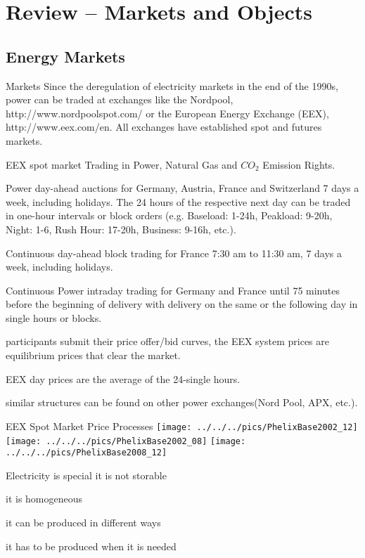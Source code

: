 \section{Review -- Markets and Objects}
\subsection{Energy Markets}

Markets
	Since the deregulation of electricity markets in the end of the 1990s,
	power can be traded at exchanges like the Nordpool, http://www.nordpoolspot.com/
	or the European Energy Exchange (EEX), http://www.eex.com/en. All
	exchanges have established spot and futures markets.


EEX spot market 
	Trading in Power, Natural Gas and $CO_{2}$ Emission Rights. 
	
	Power day-ahead auctions for Germany, Austria, France and Switzerland 7 days a week, including holidays. 
	The 24 hours of the respective next day can be traded in one-hour intervals or block orders (e.g. Baseload: 1-24h, Peakload: 9-20h, Night: 1-6, Rush Hour: 17-20h, Business: 9-16h, etc.). 
	
	Continuous day-ahead block trading for France 7:30 am to 11:30 am, 7 days a week, including holidays. 
	
	Continuous Power intraday trading for Germany and France until 75 minutes before the beginning of delivery with delivery on the same or the following day in single hours or blocks. 

	participants submit their price offer/bid curves, the EEX system prices are equilibrium prices that clear the market. 

	EEX day prices are the average of the 24-single hours. 

	similar structures can be found on other power exchanges(Nord Pool, APX, etc.). 


EEX Spot Market Price Processes
	\texttt{[image: ../../../pics/PhelixBase2002\_12]}
	\texttt{[image: ../../../pics/PhelixBase2002\_08]}
	\texttt{[image: ../../../pics/PhelixBase2008\_12]}


Electricity is special 
	it is not storable 
	
	it is homogeneous 
	
	it can be produced in different ways 
	
	it has to be produced when it is needed 
	
